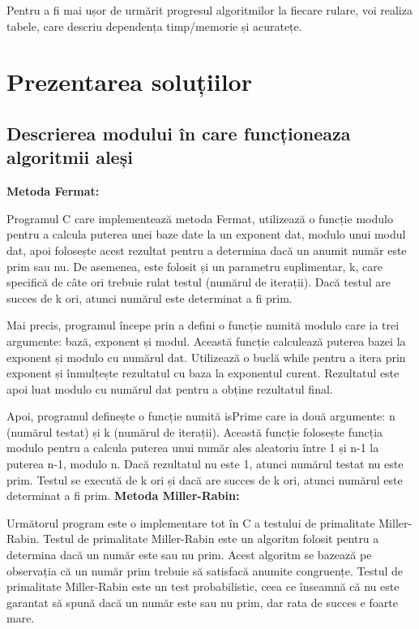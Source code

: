 \documentclass[runningheads]{llncs}
\begin{document}
Pentru a fi mai ușor de urmărit progresul algoritmilor la fiecare rulare, voi realiza tabele, care descriu dependența
timp/memorie și acuratețe.

\section{Prezentarea soluțiilor}

\subsection{Descrierea modului în care funcționeaza algoritmii aleși}
\textbf{Metoda Fermat:}

Programul C care implementează metoda Fermat, utilizează o funcție modulo pentru a calcula puterea unei baze date
la un exponent dat, modulo unui modul dat, apoi folosește acest rezultat pentru a determina dacă un anumit număr este prim sau nu.
De asemenea, este folosit și un parametru suplimentar, k, care specifică de câte ori trebuie rulat testul (numărul de iterații).
Dacă testul are succes de k ori, atunci numărul este determinat a fi prim.

Mai precis, programul începe prin a defini o funcție numită modulo care ia trei argumente: bază, exponent și modul. Această funcție calculează
puterea bazei la exponent și modulo cu numărul dat. Utilizează o buclă while pentru a itera prin exponent și înmulțește rezultatul cu baza
la exponentul curent. Rezultatul este apoi luat modulo cu numărul dat pentru a obține rezultatul final.

Apoi, programul definește o funcție numită isPrime care ia două argumente: n (numărul testat) și k (numărul de iterații).
Această funcție folosește funcția modulo pentru a calcula puterea unui număr ales aleatoriu între 1 și n-1 la puterea n-1, modulo n.
Dacă rezultatul nu este 1, atunci numărul testat nu este prim. Testul se execută de k ori și dacă are succes de k ori, atunci numărul
este determinat a fi prim. \newline \newline
\textbf{Metoda Miller-Rabin:}

Următorul program este o implementare tot în C a testului de primalitate Miller-Rabin. Testul de primalitate Miller-Rabin este un algoritm
folosit pentru a determina dacă un număr este sau nu prim. Acest algoritm se bazează pe observația că un număr prim trebuie să
satisfacă anumite congruențe. Testul de primalitate Miller-Rabin este un test probabilistic, ceea ce înseamnă că nu este garantat
să spună dacă un număr este sau nu prim, dar rata de succes e foarte mare.
\end{document}
